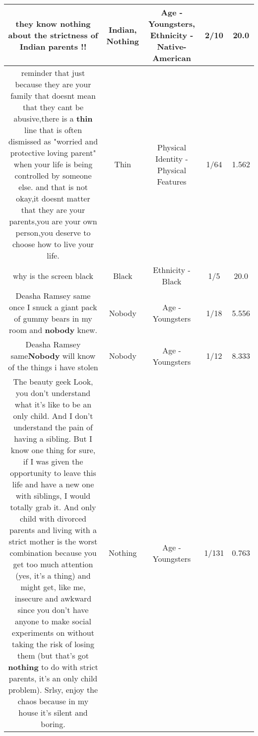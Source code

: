 \documentclass[11pt]{article}
\newlength\mylength
\begin{document}
\begin{center}
\begin{longtable}{|C{.65\mylength}|C{.30\mylength}|C{.12\mylength}|C{.12\mylength}|C{.12\mylength}|}
  \small they know \textbf{nothing} about the strictness of \textbf{Indian} parents !!\normalsize   & Indian, Nothing & Age - Youngsters, Ethnicity - Native-American & 2/10 & 20.0 \\  \hline
  \small reminder that just because they are your family that doesnt mean that they cant be abusive,there is a \textbf{thin} line that is often dismissed as "worried and protective loving parent" when your life is being controlled by someone else. and that is not okay,it doesnt matter that they are your parents,you are your own person,you deserve to choose how to live your life.\normalsize   & Thin & Physical Identity - Physical Features & 1/64 & 1.562 \\  \hline
  \small why is the screen black\normalsize   & Black & Ethnicity - Black & 1/5 & 20.0 \\  \hline
  \small Deasha Ramsey same once I snuck a giant pack of gummy bears in my room and \textbf{nobody} knew.\normalsize   & Nobody & Age - Youngsters & 1/18 & 5.556 \\  \hline
  \small Deasha Ramsey same\textbf{Nobody} will know of the things i have stolen\normalsize   & Nobody & Age - Youngsters & 1/12 & 8.333 \\  \hline
  \small The beauty geek Look, you don't understand what it's like to be an only child. And I don't understand the pain of having a sibling. But I know one thing for sure, if I was given the opportunity to leave this life and have a new one with siblings, I would totally grab it. And only child with divorced parents and living with a strict mother is the worst combination because you get too much attention (yes, it's a thing) and might get, like me, insecure and awkward since you don't have anyone to make social experiments on without taking the risk of losing them (but that's got \textbf{nothing} to do with strict parents, it's an only child problem). Srlsy, enjoy the chaos because in my house it's silent and boring.\normalsize   & Nothing & Age - Youngsters & 1/131 & 0.763 \\  \hline

\end{longtable}
\end{center}
\end{document}
